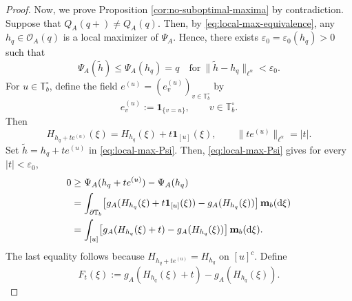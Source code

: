 \documentclass[a4paper, 11pt]{article}
\newcommand{\1}{\mathbf 1}
\theoremstyle{plain}
\begin{document}
\begin{proof}
\par
Now, we prove Proposition \ref{cor:no-suboptimal-maxima} by contradiction. Suppose that \(Q_A(q+)\neq Q_A(q)\). Then, by \eqref{eq:local-max-equivalence}, any \(h_q\in \mathcal O_A(q)\) is a local maximizer of \(\Psi_A\). Hence, there exists
\(\varepsilon_0=\varepsilon_0(h_q)>0\) such that
\begin{equation}\label{eq:local-max-Psi}
  \Psi_A(\widetilde h)\leq\Psi_A(h_q)=q
  \quad\text{for}
  \ \|\widetilde h-h_q\|_{\ell^\alpha}<\varepsilon_0.
\end{equation}
For \(u\in\mathbb{T}_b^\circ\), define the field
\(e^{(u)}=(e^{(u)}_v)_{v\in\mathbb{T}_b^\circ}\) by
\[
  e^{(u)}_v:=\mathbf{1}_{\{v=u\}},
  \qquad v\in\mathbb{T}_b^\circ.
\]
Then
\[
  H_{h_q+te^{(u)}}(\xi)
  =H_{h_q}(\xi)+t\mathbf{1}_{[u]}(\xi),
  \qquad
  \|te^{(u)}\|_{\ell^\alpha}=|t|.
\]
Set $\widetilde h=h_q+te^{(u)}$ in \eqref{eq:local-max-Psi}. Then, \eqref{eq:local-max-Psi} gives for every
\(|t|<\varepsilon_0\),
\begin{align}\label{5thtr6ye3}
  0
  &\geq \Psi_A(h_q+te^{(u)})-\Psi_A(h_q)\notag\\
  &=\int_{\partial\mathbb{T}_b}
  \bigl[g_A(H_{h_q}(\xi)+t\mathbf{1}_{[u]}(\xi))
         -g_A(H_{h_q}(\xi))\bigr]
  \,\mathbf m_b(\mathrm{d}\xi)\notag\\
  &=\int_{[u]}
  \bigl[g_A(H_{h_q}(\xi)+t)-g_A(H_{h_q}(\xi))\bigr]
  \,\mathbf m_b(\mathrm{d}\xi).
\end{align}
The last equality follows because
\(H_{h_q+te^{(u)}}=H_{h_q}\) on \([u]^c\).
Define
\[
  F_t(\xi)
  :=g_A(H_{h_q}(\xi)+t)-g_A(H_{h_q}(\xi)).
\]
\par


\end{proof}
\end{document}
